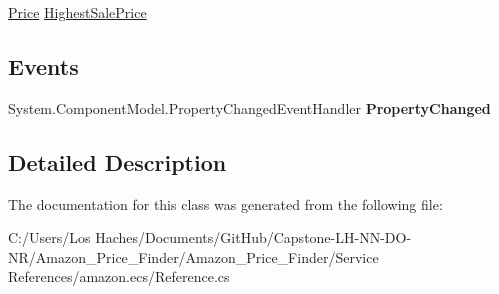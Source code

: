 \begin{DoxyCompactItemize}
\begin{DoxyCompactList}\small\item\em \end{DoxyCompactList}\item 
\hypertarget{class_amazon___price___finder_1_1amazon_1_1ecs_1_1_collections_collection_collection_summary_ac9fae055190ee078d93e450cb906e3b7}{\hyperlink{class_amazon___price___finder_1_1amazon_1_1ecs_1_1_price}{Price} \hyperlink{class_amazon___price___finder_1_1amazon_1_1ecs_1_1_collections_collection_collection_summary_ac9fae055190ee078d93e450cb906e3b7}{Highest\-Sale\-Price}}\label{class_amazon___price___finder_1_1amazon_1_1ecs_1_1_collections_collection_collection_summary_ac9fae055190ee078d93e450cb906e3b7}

\begin{DoxyCompactList}\small\item\em \end{DoxyCompactList}\end{DoxyCompactItemize}
\subsection*{Events}
\begin{DoxyCompactItemize}
\item 
\hypertarget{class_amazon___price___finder_1_1amazon_1_1ecs_1_1_collections_collection_collection_summary_a7b6d1e4fe76d44fca2e5e3605270d17d}{System.\-Component\-Model.\-Property\-Changed\-Event\-Handler {\bfseries Property\-Changed}}\label{class_amazon___price___finder_1_1amazon_1_1ecs_1_1_collections_collection_collection_summary_a7b6d1e4fe76d44fca2e5e3605270d17d}

\end{DoxyCompactItemize}


\subsection{Detailed Description}


The documentation for this class was generated from the following file\-:\begin{DoxyCompactItemize}
\item 
C\-:/\-Users/\-Los Haches/\-Documents/\-Git\-Hub/\-Capstone-\/\-L\-H-\/\-N\-N-\/\-D\-O-\/\-N\-R/\-Amazon\-\_\-\-Price\-\_\-\-Finder/\-Amazon\-\_\-\-Price\-\_\-\-Finder/\-Service References/amazon.\-ecs/Reference.\-cs\end{DoxyCompactItemize}
